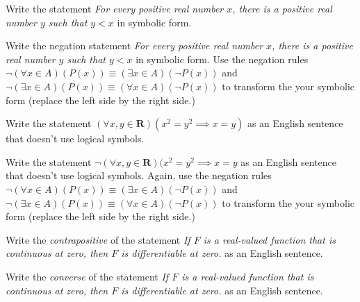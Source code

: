 \documentclass[12pt,fleqn]{exam}
\newcommand{\reals}{\mathbf{R}}
\begin{document}
\begin{questions}

\question [3] Write the statement  \emph{For every positive real number \(x\), there is a positive real number \(y\) such that \( y < x\) } in symbolic form.

\question [3]  Write the negation statement  \emph{For every positive real number \(x\), there is a positive real number \(y\) such that \( y < x\) } in symbolic form.  Use the negation rules 
\( \lnot (\forall x \in A)(P(x)) \equiv (\exists x \in A)(\lnot P(x)) \) and \(  \lnot (\exists x \in A)(P(x)) \equiv (\forall x \in A)(\lnot P(x)) \) to transform the your symbolic form (replace the left side by the right side.)

\question [3] Write the statement \( (\forall x,y \in \reals) (x^2 = y^2 \implies x = y) \) as an English sentence that doesn't use logical symbols.

\question [3] Write the statement \( \lnot (\forall x,y \in \reals) (x^2 = y^2 \implies x = y\) as an English sentence that doesn't use logical symbols. Again,  use the negation rules 
\( \lnot (\forall x \in A)(P(x)) \equiv (\exists x \in A)(\lnot P(x)) \) and \(  \lnot (\exists x \in A)(P(x)) \equiv (\forall x \in A)(\lnot P(x)) \) to transform the your symbolic form (replace the left side by the right side.)

\question [3] Write the \emph{contrapositive} of the statement \emph{If \(F\) is a real-valued function that is continuous at zero, then \(F\) is differentiable at zero.} as an English sentence.

\question [3] Write the \emph{converse} of the statement \emph{If \(F\) is a real-valued function that is continuous at zero, then \(F\) is differentiable at zero.} as an English sentence.


\end{questions}
\end{document}
